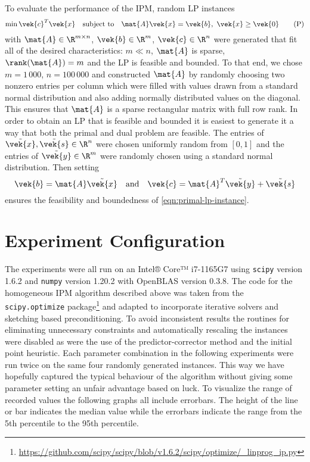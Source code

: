 To evaluate the performance of the IPM, random LP instances 
\begin{equation}\label{eqn:primal-lp-instance}
  \min \vek{c}^T \vek{x} \quad \text{subject to} \quad \mat{A}\vek{x} = \vek{b}, \ \vek{x} \geq \vek{0} \tag{P}
 \end{equation}
with \(\mat{A} \in \R^{m \times n}\), \(\vek{b} \in \R^m\), \(\vek{c} \in \R^n\) were generated that fit all of the desired characteristics: \(m \ll n\), \(\mat{A}\) is sparse, \(\rank(\mat{A}) = m\) and the LP is feasible and bounded.
To that end, we chose \(m = 1\,000\), \(n = 100\,000\) and constructed \(\mat{A}\) by randomly choosing two nonzero entries per column which were filled with values drawn from a standard normal distribution and also adding normally distributed values on the diagonal.
This ensures that \(\mat{A}\) is a sparse rectangular matrix with full row rank.
In order to obtain an LP that is feasible and bounded it is easiest to generate it a way that both the primal and dual problem are feasible.
The entries of \(\tilde{\vek{x}}, \tilde{\vek{s}} \in \R^n\) were chosen uniformly random from \([0, 1]\) and the entries of \(\tilde{\vek{y}} \in \R^m\) were randomly chosen using a standard normal distribution.
Then setting
\begin{equation}
  \vek{b} = \mat{A} \tilde{\vek{x}} \quad \text{and} \quad \vek{c} = \mat{A}^T \tilde{\vek{y}} + \tilde{\vek{s}}
\end{equation}
ensures the feasibility and boundedness of \cref{eqn:primal-lp-instance}.

\section{Experiment Configuration}

The experiments were all run on an Intel® Core™ i7-1165G7 using \texttt{scipy} version 1.6.2 and \texttt{numpy} version 1.20.2 with OpenBLAS version 0.3.8.
The code for the homogeneous IPM algorithm described above was taken from the \texttt{scipy.optimize} package\footnote{\url{https://github.com/scipy/scipy/blob/v1.6.2/scipy/optimize/_linprog_ip.py}} and adapted to incorporate iterative solvers and sketching based preconditioning.
To avoid inconsistent results the routines for eliminating unnecessary constraints and automatically rescaling the instances were disabled as were the use of the predictor-corrector method and the initial point heuristic.
Each parameter combination in the following experiments were run twice on the same four randomly generated instances.
This way we have hopefully captured the typical behaviour of the algorithm without giving some parameter setting an unfair advantage based on luck.
To visualize the range of recorded values the following graphs all include errorbars.
The height of the line or bar indicates the median value while the errorbars indicate the range from the 5th percentile to the 95th percentile.

